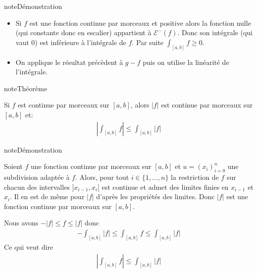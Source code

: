 \documentclass[letterpaper,10pt,french]{sphinxmanual}
\begin{document}
\begin{sphinxadmonition}{note}{Démonstration}
\begin{itemize}
\item {} 
\sphinxAtStartPar
Si \(f\) est une fonction continue par morceaux et positive alors la fonction nulle (qui constante donc en escalier) appartient à \(\mathcal E^-(f)\). Donc son intégrale (qui vaut 0) est inférieure à l’intégrale de \(f\). Par suite \(\int_{[a, b]} f \geq 0\).

\item {} 
\sphinxAtStartPar
On applique le résultat précèdent à \(g-f\) puis on utilise la linéarité de l’intégrale.

\end{itemize}
\end{sphinxadmonition}

\begin{sphinxadmonition}{note}{Théorème}

\sphinxAtStartPar
Si \(f\) est continue par morceaux sur \([a, b]\), alors \(|f|\) est continue par morceaux sur \([a, b]\) et:
\begin{equation*}
\begin{split}
\left |\int_{[a, b]}f \right | \leq \int_{[a, b]}|f|
\end{split}
\end{equation*}\end{sphinxadmonition}

\begin{sphinxadmonition}{note}{Démonstration}

\sphinxAtStartPar
Soient \(f\) une fonction continue par morceaux sur \([a, b]\) et \(u=(x_i)_{i=0}^n\) une subdivision adaptée à \(f\). Alors, pour tout \(i \in \{1, \ldots, n\}\) la restriction de \(f\) sur chacun des intervalles \(]x_{i-1}, x_i[\) est continue et admet des limites finies en \(x_{i-1}\) et \(x_i\). Il en est de même pour \(|f|\) d’après les propriétés des limites. Donc \(|f|\) est une fonction continue par morceaux sur \([a, b]\).

\sphinxAtStartPar
Nous avons \(-|f| \leq f \leq |f|\) donc
\begin{equation*}
\begin{split}
- \int_{[a, b]}|f| \leq \int_{[a, b]}f \leq \int_{[a, b]}|f|  
\end{split}
\end{equation*}
\sphinxAtStartPar
Ce qui veut dire
\begin{equation*}
\begin{split}
\left| \int_{[a, b]}f \right | \leq \int_{[a, b]}|f|  
\end{split}
\end{equation*}\end{sphinxadmonition}
\end{document}
